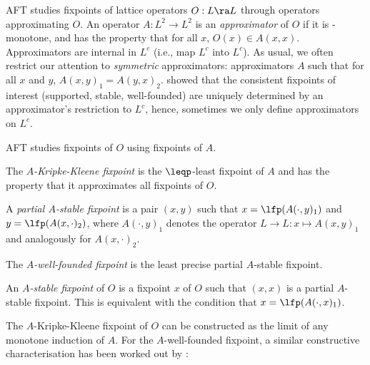 

AFT studies fixpoints of lattice operators $O:L\ra L$ through operators approximating $O$.
 An operator $A: L^2\to L^2$  is an \emph{approximator} of $O$ if it is \leqp-monotone,  and has the property that for all $x$, $O(x)\in A(x,x)$. %
Approximators are
internal in $L^c$ (i.e., map $L^c$ into $L^c$).
As usual, we often restrict our attention to \emph{symmetric} approximators: approximators $A$ such that for all $x$ and $y$, $A(x,y)_1 = A(y,x)_2$. %
\cite{DeneckerMT04} showed that the consistent fixpoints of interest (supported, stable, well-founded) are uniquely determined by an approximator's restriction to $L^c$, hence, sometimes we only define approximators on $L^c$. 

AFT studies fixpoints of $O$ using fixpoints of $A$. 
 \begin{compactitem}
  \item The \emph{$A$-Kripke-Kleene fixpoint} is the $\leqp$-least fixpoint of $A$ and has the property that it approximates all fixpoints of $O$. 
\item A \emph{partial $A$-stable fixpoint} is a pair  $(x,y)$ such that $x=\lfp(A(\cdot,y)_1)$ and $y=\lfp(A(x,\cdot)_2)$, where $A(\cdot,y)_1$ denotes the operator $L\to L:x\mapsto A(x,y)_1$ and analogously for $A(x,\cdot)_2$. 
\item The \emph{$A$-well-founded fixpoint} is the least precise partial $A$-stable fixpoint. 
\item  An \emph{$A$-stable fixpoint} of $O$ is a fixpoint $x$ of $O$ such that $(x,x)$ is a partial $A$-stable fixpoint. This is equivalent with the condition that $x=\lfp(A(\cdot, x)_1)$.  
 \end{compactitem}

% 
% 
The $A$-Kripke-Kleene fixpoint of $O$ can be constructed as the limit of any monotone induction of $A$. 
For the $A$-well-founded fixpoint, a similar constructive characterisation has been worked out by \citet{lpnmr/DeneckerV07}:
 


